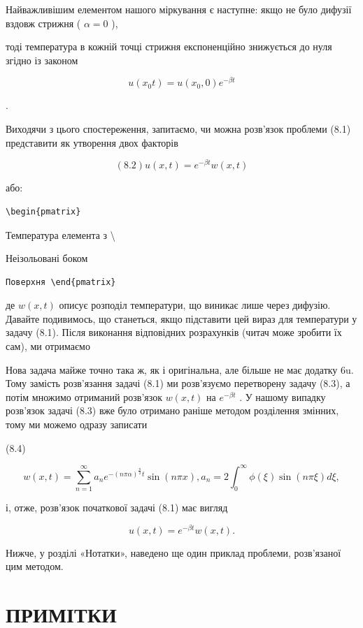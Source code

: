 \documentclass[
  ukrainian,
]{article}
\begin{document}
Найважливішим елементом нашого міркування є наступне: якщо не було
дифузії вздовж стрижня ( \(\alpha = 0\) ),

тоді температура в кожній точці стрижня експоненційно знижується до нуля
згідно із законом

\[
u(x_0 t) = u(x_0, 0) e^{-\beta t}
\]

.

Виходячи з цього спостереження, запитаємо, чи можна розв'язок проблеми
(8.1) представити як утворення двох факторів

\[
(8.2) u(x, t) = e^{-\beta t}w(x, t)
\]

або:

\begin{verbatim}
\begin{pmatrix}
\end{verbatim}

Температура елемента з \textbackslash{}

Неізольовані боком

\begin{verbatim}
Поверхня \end{pmatrix}
\end{verbatim}

де \(w(x, t)\) описує розподіл температури, що виникає лише через
дифузію. Давайте подивимось, що станеться, якщо підставити цей вираз для
температури у задачу (8.1). Після виконання відповідних розрахунків
(читач може зробити їх сам), ми отримаємо

Нова задача майже точно така ж, як і оригінальна, але більше не має
додатку 6u. Тому замість розв'язання задачі (8.1) ми розв'язуємо
перетворену задачу (8.3), а потім множимо отриманий розв'язок
\(w(x, t)\) на \(e^{-\beta t}\) . У нашому випадку розв'язок задачі
(8.3) вже було отримано раніше методом розділення змінних, тому ми
можемо одразу записати

(8.4)

\[
w(x, t) = \sum_{n=1}^{\infty} a_n e^{-(n\pi\alpha)^{\frac{n}{2}}t} \sin(n\pi x),
a_n = 2 \int_0^{\infty} \phi(\xi) \sin(n\pi \xi) d\xi,
\]

і, отже, розв'язок початкової задачі (8.1) має вигляд

\[
u(x, t) = e^{-\beta t}w(x, t).
\]

Нижче, у розділі «Нотатки», наведено ще один приклад проблеми,
розв'язаної цим методом.

\section{ПРИМІТКИ}\label{ux43fux440ux438ux43cux456ux442ux43aux438}
\end{document}
